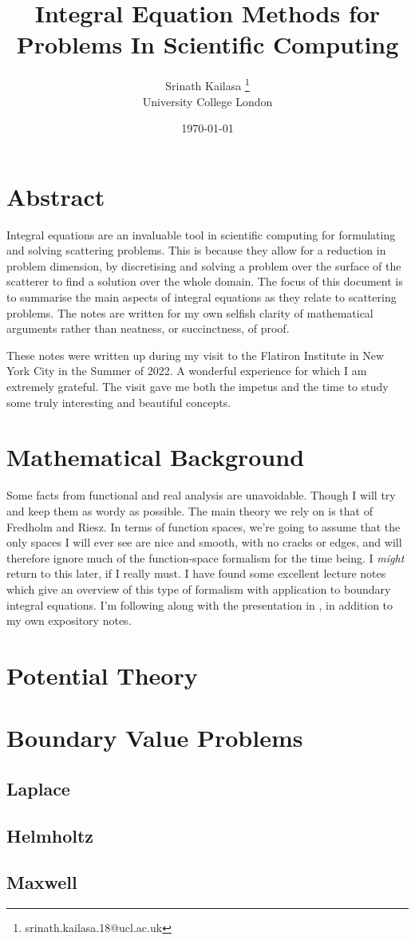 \documentclass[12pt, a4, twoside]{article}
\title{Integral Equation Methods for Problems In Scientific Computing}
\author{Srinath Kailasa \thanks{srinath.kailasa.18@ucl.ac.uk} \\ \small University College London}
\date{\today}
\begin{document}
\maketitle

\section*{Abstract}

Integral equations are an invaluable tool in scientific computing for formulating and solving scattering problems. This is because they allow for a reduction in problem dimension, by discretising and solving a problem over the surface of the scatterer to find a solution over the whole domain. The focus of this document is to summarise the main aspects of integral equations as they relate to scattering problems. The notes are written for my own selfish clarity of mathematical arguments rather than neatness, or succinctness, of proof. 

These notes were written up during my visit to the Flatiron Institute in New York City in the Summer of 2022. A wonderful experience for which I am extremely grateful. The visit gave me both the impetus and the time to study some truly interesting and beautiful concepts.

\tableofcontents


\section{Mathematical Background}\label{sec:mathematical_background}

Some facts from functional and real analysis are unavoidable. Though I will try and keep them as wordy as possible. The main theory we rely on is that of Fredholm and Riesz. In terms of function spaces, we're going to assume that the only spaces I will ever see are nice and smooth, with no cracks or edges, and will therefore ignore much of the function-space formalism for the time being. I \textit{might} return to this later, if I really must. I have found some excellent lecture notes \cite{moiola2022} which give an overview of this type of formalism with application to boundary integral equations. I'm following along with the presentation in \cite{coltonkress2013,kress2012}, in addition to my own expository notes.


\section{Potential Theory}


\section{Boundary Value Problems}

\subsection{Laplace}


\subsection{Helmholtz}

\subsection{Maxwell}


\printbibliography[heading=bibintoc]
\end{document}
